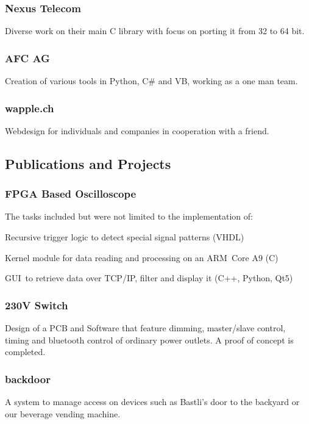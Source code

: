 \documentclass[]{resume}
\begin{document}
\begin{timeline}
\subsubsection{Nexus Telecom}
Diverse work on their main C library with focus on porting it from 32 to 64 bit.
\sectionsep

\subsubsection{AFC AG}
Creation of various tools in Python, C\# and VB, working as a one man team.
\sectionsep

\subsubsection{wapple.ch}
Webdesign for individuals and companies in cooperation with a friend.
\sectionsep


\subsection{Publications and Projects}

\subsubsection{FPGA Based Oscilloscope}
The tasks included but were not limited to the implementation of:
\begin{tightemize}
\item Recursive trigger logic to detect special signal patterns (VHDL)
\item Kernel module for data reading and processing on an ARM Core A9 (C)
\item GUI to retrieve data over TCP/IP, filter and display it (C++, Python, Qt5)
\end{tightemize}
\sectionsep

\subsubsection{230V Switch}
Design of a PCB and Software that feature dimming, master/slave control, timing and bluetooth control of ordinary power outlets. A proof of concept is completed.
\sectionsep
\subsubsection{backdoor}
A system to manage access on devices such as Bastli's door to the backyard or our beverage vending machine.
\sectionsep

\end{timeline}
\end{document}
